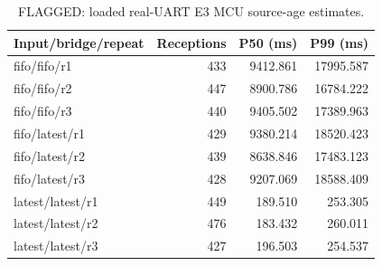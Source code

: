 \begin{table}[H]
\centering\small
\caption{FLAGGED: loaded real-UART E3 MCU source-age estimates.}\label{tab:real}
\begin{tabular}{lrrr}
\toprule
Input/bridge/repeat & Receptions & P50 (ms) & P99 (ms) \\
\midrule
fifo/fifo/r1 & 433 & 9412.861 & 17995.587 \\
fifo/fifo/r2 & 447 & 8900.786 & 16784.222 \\
fifo/fifo/r3 & 440 & 9405.502 & 17389.963 \\
fifo/latest/r1 & 429 & 9380.214 & 18520.423 \\
fifo/latest/r2 & 439 & 8638.846 & 17483.123 \\
fifo/latest/r3 & 428 & 9207.069 & 18588.409 \\
latest/latest/r1 & 449 & 189.510 & 253.305 \\
latest/latest/r2 & 476 & 183.432 & 260.011 \\
latest/latest/r3 & 427 & 196.503 & 254.537 \\
\bottomrule
\end{tabular}
\end{table}
